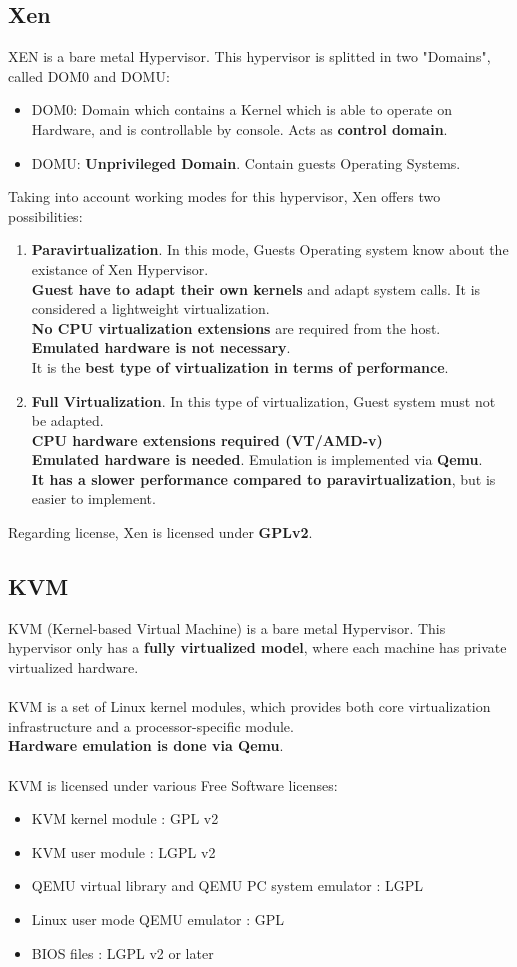 \documentclass[11pt]{article}
\begin{document}
\subsection{Xen}
XEN is a bare metal Hypervisor. This hypervisor is splitted in two "Domains", called DOM0 and DOMU:
\begin{itemize}
\item{DOM0}: Domain which contains a Kernel which is able to operate on Hardware, and is controllable by console. Acts as \textbf{control domain}.
\item{DOMU}: \textbf{Unprivileged Domain}. Contain guests Operating Systems.
\end{itemize}
Taking into account working modes for this hypervisor, Xen offers two possibilities:
\begin{enumerate}
\item{\textbf{Paravirtualization}}. In this mode, Guests Operating system know about the existance of Xen Hypervisor.\\
\textbf{Guest have to adapt their own kernels} and adapt system calls. It is considered a lightweight virtualization.\\ 
\textbf{No CPU virtualization extensions} are required from the host.\\
\textbf{Emulated hardware is not necessary}.\\
It is the \textbf{best type of virtualization in terms of performance}.
\item{\textbf{Full Virtualization}}. In this type of virtualization, Guest system must not be adapted.\\
\textbf{CPU hardware extensions required (VT/AMD-v)}\\
\textbf{Emulated hardware is needed}. Emulation is implemented via \textbf{Qemu}.\\
\textbf{It has a slower performance compared to paravirtualization}, but is easier to implement.
\end{enumerate}
Regarding license, Xen is licensed under \textbf{GPLv2}.
\subsection{KVM}
KVM (Kernel-based Virtual Machine) is a bare metal Hypervisor. This hypervisor only has a \textbf{fully virtualized model}, where each machine has private virtualized hardware.\\
\\
KVM is a set of Linux kernel modules, which provides both core virtualization infrastructure and a processor-specific module.\\
\textbf{Hardware emulation is done via Qemu}.\\
\\
KVM is licensed under various Free Software licenses:
\begin{itemize}
\item{KVM kernel module} : GPL v2
\item{KVM user module} : LGPL v2
\item{QEMU virtual library and QEMU PC system emulator} : LGPL
\item{Linux user mode QEMU emulator} : GPL
\item{BIOS files} : LGPL v2 or later
\end{itemize}
\end{document}
